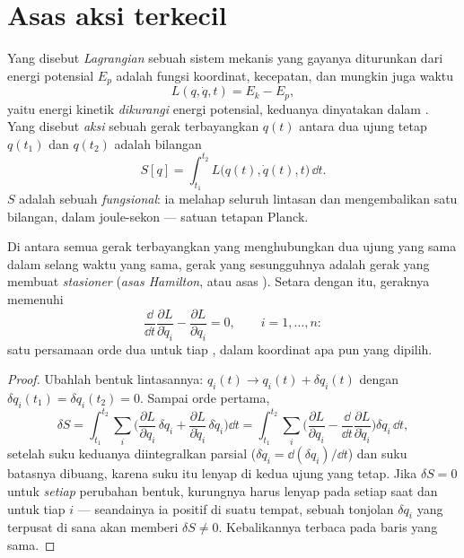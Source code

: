 \section{Asas aksi terkecil}

\begin{definition}\label{def:b3:lagrangian-mechanics:action}
Yang disebut \emph{Lagrangian} sebuah sistem mekanis yang gayanya
diturunkan dari energi potensial $E_p$ adalah fungsi koordinat,
kecepatan, dan mungkin juga waktu
\[
L(q, \dot q, t) = E_k - E_p ,
\]
yaitu energi kinetik \emph{dikurangi} energi potensial, keduanya
dinyatakan dalam . Yang disebut \emph{aksi} sebuah
gerak terbayangkan $q(t)$ antara dua ujung tetap $q(t_1)$ dan $q(t_2)$
adalah bilangan
\[
S[q] = \int_{t_1}^{t_2} L\big(q(t), \dot q(t), t\big)\,\dd t .
\]
$S$ adalah sebuah \emph{fungsional}: ia melahap seluruh lintasan dan
mengembalikan satu bilangan, dalam joule-sekon --- satuan tetapan Planck.
\end{definition}

\begin{theorem}\label{thm:b3:lagrangian-mechanics:euler-lagrange}
Di antara semua gerak terbayangkan yang menghubungkan dua ujung yang
sama dalam selang waktu yang sama, gerak yang sesungguhnya adalah gerak
yang membuat  \emph{stasioner} (\emph{asas Hamilton}, atau asas
\emph{}). Setara dengan itu, geraknya memenuhi
\emph{}
\[
\frac{\dd}{\dd t}\frac{\partial L}{\partial\dot q_i}
 - \frac{\partial L}{\partial q_i} = 0 ,
\qquad i = 1, \dots, n :
\]
satu persamaan orde dua untuk tiap , dalam koordinat
apa pun yang dipilih.
\end{theorem}

\begin{proof}
Ubahlah bentuk lintasannya: $q_i(t) \to q_i(t) + \delta q_i(t)$ dengan
$\delta q_i(t_1) = \delta q_i(t_2) = 0$. Sampai orde pertama,
\[
\delta S = \int_{t_1}^{t_2}\sum_i\Big(
  \frac{\partial L}{\partial q_i}\,\delta q_i
 + \frac{\partial L}{\partial\dot q_i}\,\delta\dot q_i\Big)\dd t
 = \int_{t_1}^{t_2}\sum_i\Big(
  \frac{\partial L}{\partial q_i}
 - \frac{\dd}{\dd t}\frac{\partial L}{\partial\dot q_i}\Big)\delta q_i\,\dd t ,
\]
setelah suku keduanya diintegralkan parsial ($\delta\dot q_i =
\dd(\delta q_i)/\dd t$) dan suku batasnya dibuang, karena suku itu
lenyap di kedua ujung yang tetap. Jika $\delta S = 0$ untuk
\emph{setiap} perubahan bentuk, kurungnya harus lenyap pada setiap saat
dan untuk tiap $i$ --- seandainya ia positif di suatu tempat, sebuah
tonjolan $\delta q_i$ yang terpusat di sana akan memberi
$\delta S \neq 0$. Kebalikannya terbaca pada baris yang sama.
\end{proof}

